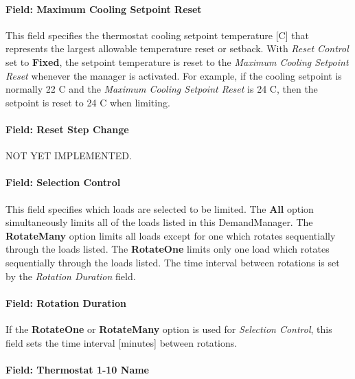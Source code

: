 \paragraph{Field: Maximum Cooling Setpoint Reset}\label{field-maximum-cooling-setpoint-reset}

This field specifies the thermostat cooling setpoint temperature {[}C{]} that represents the largest allowable temperature reset or setback. With \emph{Reset Control} set to \textbf{Fixed}, the setpoint temperature is reset to the \emph{Maximum Cooling Setpoint Reset} whenever the manager is activated. For example, if the cooling setpoint is normally 22 C and the \emph{Maximum Cooling Setpoint Reset} is 24 C, then the setpoint is reset to 24 C when limiting.

\paragraph{Field: Reset Step Change}\label{field-reset-step-change}

NOT YET IMPLEMENTED.

\paragraph{Field: Selection Control}\label{field-selection-control-3}

This field specifies which loads are selected to be limited. The \textbf{All} option simultaneously limits all of the loads listed in this DemandManager. The \textbf{RotateMany} option limits all loads except for one which rotates sequentially through the loads listed. The \textbf{RotateOne} limits only one load which rotates sequentially through the loads listed. The time interval between rotations is set by the \emph{Rotation Duration} field.

\paragraph{Field: Rotation Duration}\label{field-rotation-duration-3}

If the \textbf{RotateOne} or \textbf{RotateMany} option is used for \emph{Selection Control}, this field sets the time interval {[}minutes{]} between rotations.

\paragraph{Field: Thermostat 1-10 Name}\label{field-thermostat-1-10-name}


